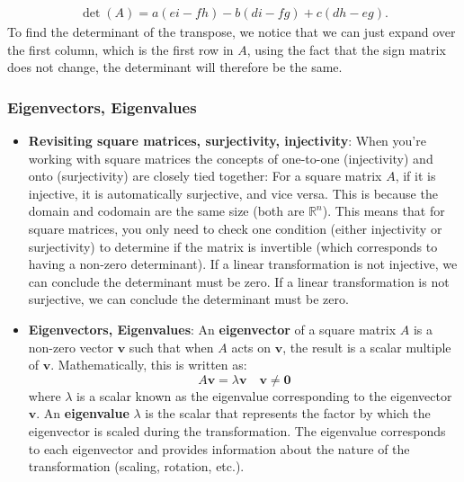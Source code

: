 \documentclass{report}
\begin{document}
\begin{itemize}
        \begin{align*}
            \det(A) = a(ei-fh) - b(di-fg) + c(dh-eg)
        .\end{align*}
        To find the determinant of the transpose, we notice that we can just expand over the first column, which is the first row in  $A$, using the fact that the sign matrix does not change, the determinant will therefore be the same.
        

    \end{itemize}

    \pagebreak 
    \subsubsection{Eigenvectors, Eigenvalues}
    \begin{itemize}
        \item \textbf{Revisiting square matrices, surjectivity, injectivity}: When you're working with square matrices the concepts of one-to-one (injectivity) and onto (surjectivity) are closely tied together:
            \bigbreak \noindent 
            For a square matrix $A$, if it is injective, it is automatically surjective, and vice versa. This is because the domain and codomain are the same size (both are $\mathbb{R}^{n}$).
            \bigbreak \noindent 
            This means that for square matrices, you only need to check one condition (either injectivity or surjectivity) to determine if the matrix is invertible (which corresponds to having a non-zero determinant).
            \bigbreak \noindent 
            If a linear transformation is not injective, we can conclude the determinant must be zero.
            \bigbreak \noindent 
            If a linear transformation is not surjective, we can conclude the determinant must be zero.
        \item \textbf{Eigenvectors, Eigenvalues}:
            An \textbf{eigenvector} of a square matrix \( A \) is a non-zero vector \( \mathbf{v} \) such that when \( A \) acts on \( \mathbf{v} \), the result is a scalar multiple of \( \mathbf{v} \). Mathematically, this is written as:
            \[
                A \mathbf{v} = \lambda \mathbf{v} \quad \mathbf{v} \ne \mathbf{0}
            \]
            where \( \lambda \) is a scalar known as the eigenvalue corresponding to the eigenvector \( \mathbf{v} \).
            \bigbreak \noindent 
            An \textbf{eigenvalue} \( \lambda \) is the scalar that represents the factor by which the eigenvector is scaled during the transformation. The eigenvalue corresponds to each eigenvector and provides information about the nature of the transformation (scaling, rotation, etc.).

\end{itemize}
\end{document}
